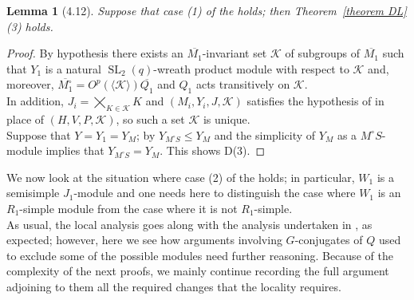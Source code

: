 \documentclass{amsart}
\numberwithin{equation}{section}
\newtheorem{lemma}[equation]{Lemma}
\theoremstyle{definition}
\theoremstyle{subresult}
\theoremstyle{caseresult}
\newcommand{\SL}{\operatorname{SL}}
\newcommand{\ov}{\overline}
\newcommand{\<}{\langle}
\renewcommand{\>}{\rangle}
\begin{document}
\begin{lemma}[4.12] \label{lemma4.12}
	Suppose that case (1) of the  holds; then Theorem~\ref{theorem DL}(3) holds.
\end{lemma}
\begin{proof}
	By hypothesis there exists an $\ov{M_1}$-invariant set $\mathcal{K}$ of subgroups of $\ov{M_1}$ such that $Y_1$ is a natural $\SL_2(q)$-wreath product module with respect to $\mathcal{K}$ and, moreover, $\ov{M_1^\circ} = O^p(\< \mathcal{K} \>) \ov{Q_1}$ and $Q_1$ acts transitively on $\mathcal{K}$.\\
	In addition, $J_i = \bigtimes_{K \in \mathcal{K}} K$ and $(M_i, Y_i, J, \mathcal{K})$ satisfies the hypothesis of \cite[Lemma A.27]{Meier-Stell-Stroth:2012} in place of $(H, V, P, \mathcal{K})$, so such a set $\mathcal{K}$ is unique.\\
	Suppose that $Y=Y_1=Y_M$; by \cite[Lemma 2.2(b)]{MS:2009} $Y_{M^\circ S} \le Y_M$ and the simplicity of $Y_M$ as a $M^\circ S$-module implies that $Y_{M^\circ S} =Y_M$. This shows D(3).
\end{proof}

\vspace{0.4cm}
We now look at the situation where case (2) of the  holds; in particular, $W_1$ is a semisimple $J_1$-module and one needs here to distinguish the case where $W_1$ is an $R_1$-simple module from the case where it is not $R_1$-simple.\\
As usual, the local analysis goes along with the analysis undertaken in \cite{Meier-Stell-Stroth:2012}, as expected; however, here we see how arguments involving $G$-conjugates of $Q$ used to exclude some of the possible modules need further reasoning. Because of the complexity of the next proofs, we mainly continue recording the full argument adjoining to them all the required changes that the locality requires.
\end{document}
